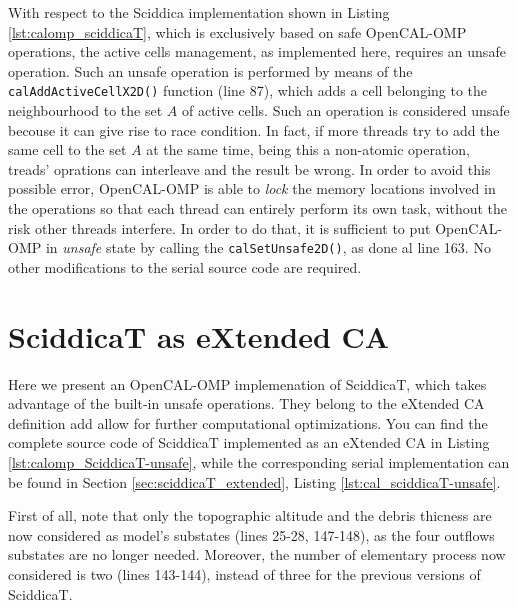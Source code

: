 With respect to the Sciddica implementation shown in Listing
\ref{lst:calomp_sciddicaT}, which is exclusively based on safe
OpenCAL-OMP operations, the active cells management, as implemented
here, requires an unsafe operation. Such an unsafe operation is
performed by means of the \verb'calAddActiveCellX2D()' function (line
87), which adds a cell belonging to the neighbourhood to the set $A$
of active cells. Such an operation is considered unsafe becouse it can
give rise to race condition. In fact, if more threads try to add the
same cell to the set $A$ at the same time, being this a non-atomic
operation, treads' oprations can interleave and the result be
wrong. In order to avoid this possible error, OpenCAL-OMP is able to
\emph{lock} the memory locations involved in the operations so that
each thread can entirely perform its own task, without the risk other
threads interfere. In order to do that, it is sufficient to put
OpenCAL-OMP in \emph{unsafe} state by calling the
\verb'calSetUnsafe2D()', as done al line 163. No other modifications
to the serial source code are required.

\section{SciddicaT as eXtended CA}
Here we present an OpenCAL-OMP implemenation of SciddicaT, which takes
advantage of the built-in unsafe operations. They belong to the
eXtended CA definition add allow for further computational
optimizations. You can find the complete source code of SciddicaT
implemented as an eXtended CA in Listing
\ref{lst:calomp_SciddicaT-unsafe}, while the corresponding serial
implementation can be found in Section \ref{sec:sciddicaT_extended},
Listing \ref{lst:cal_sciddicaT-unsafe}.



First of all, note that only the topographic altitude and the debris
thicness are now considered as model's substates (lines 25-28,
147-148), as the four outflows substates are no longer
needed. Moreover, the number of elementary process now considered is
two (lines 143-144), instead of three for the previous versions of
SciddicaT.

